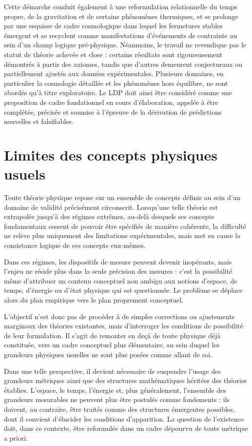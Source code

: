 \documentclass[11pt,a4paper]{article}
\begin{document}
Cette démarche conduit également à une reformulation relationnelle du temps propre, de la gravitation et de certains phénomènes thermiques, et se prolonge par une esquisse de cadre cosmologique dans lequel les fermetures stables émergent et se recyclent comme manifestations d’événements de contrainte au sein d’un champ logique pré-physique. Néanmoins, le travail ne revendique pas le statut de théorie achevée et close : certains résultats sont rigoureusement démontrés à partir des axiomes, tandis que d’autres demeurent conjecturaux ou partiellement ajustés aux données expérimentales. Plusieurs domaines, en particulier la cosmologie détaillée et les phénomènes hors équilibre, ne sont abordés qu’à titre exploratoire. Le LDP doit ainsi être considéré comme une proposition de cadre fondationnel en cours d’élaboration, appelée à être complétée, précisée et soumise à l’épreuve de la dérivation de prédictions nouvelles et falsifiables.

\newpage

\section{Limites des concepts physiques usuels}

Toute théorie physique repose sur un ensemble de concepts définis au sein d’un domaine de validité précisément circonscrit. Lorsqu’une telle théorie est extrapolée jusqu’à des régimes extrêmes, au-delà desquels ses concepts fondamentaux cessent de pouvoir être spécifiés de manière cohérente, la difficulté ne relève plus uniquement des limitations expérimentales, mais met en cause la consistance logique de ces concepts eux-mêmes.

Dans ces régimes, les dispositifs de mesure peuvent devenir inopérants, mais l’enjeu ne réside plus dans la seule précision des mesures : c’est la possibilité même d’attribuer un contenu conceptuel non ambigu aux notions d’espace, de temps, d’énergie ou d’état physique qui est questionnée. Le problème se déplace alors du plan empirique vers le plan proprement conceptuel.

L’objectif n’est donc pas de procéder à de simples corrections ou ajustements marginaux des théories existantes, mais d’interroger les conditions de possibilité de leur formulation. Il s’agit de remonter en deçà de toute physique déjà constituée, vers un cadre conceptuel plus élémentaire, au sein duquel les grandeurs physiques usuelles ne sont plus posées comme allant de soi.

Dans une telle perspective, il devient nécessaire de suspendre l’usage des grandeurs métriques ainsi que des structures mathématiques héritées des théories établies. L’espace, le temps, l’énergie et, plus généralement, l’ensemble des grandeurs mesurables ne peuvent plus être postulés comme fondements : ils doivent, au contraire, être traités comme des structures émergentes possibles, dont il convient d’élucider les conditions d’apparition. La question de l’existence doit, dans ce contexte, être reformulée dans un cadre dépourvu de toute métrique a priori.
\end{document}
